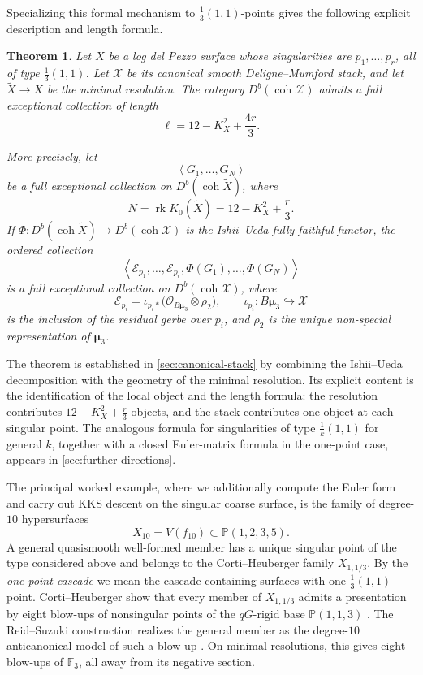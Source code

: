 \documentclass[11pt]{article}
\theoremstyle{plain}
\newtheorem{theorem}{Theorem}[section]
\theoremstyle{definition}
\theoremstyle{remark}
\newcommand{\Pp}{\mathbb P}
\newcommand{\F}{\mathbb F}
\newcommand{\Db}{D^b}
\newcommand{\coh}{\operatorname{coh}}
\newcommand{\rk}{\operatorname{rk}}
\newcommand{\XX}{\mathcal X}
\newcommand{\muthree}{\boldsymbol{\mu}_3}
\newcommand{\OO}{\mathcal O}
\begin{document}
Specializing this formal mechanism to \(\frac13(1,1)\)-points gives the
following explicit description and length formula.

\begin{theorem}\label{thm:general-main}
Let \(X\) be a log del Pezzo surface whose singularities are \(p_1,\dots,p_r\), all of type \(\frac13(1,1)\). Let \(\XX\) be its canonical smooth Deligne--Mumford stack, and let \(\widetilde X\to X\) be the minimal resolution. The category \(\Db(\coh \XX)\) admits a full exceptional collection of length
\[
\ell=12-K_X^2+\frac{4r}{3}.
\]

More precisely, let
\[
\left\langle G_1,\dots,G_N\right\rangle
\]
be a full exceptional collection on \(\Db(\coh \widetilde X)\), where
\[
N=\rk K_0(\widetilde X)=12-K_X^2+\frac r3.
\]
If \(\Phi:\Db(\coh \widetilde X)\to \Db(\coh \XX)\) is the Ishii--Ueda fully faithful functor, the ordered collection
\[
\left\langle
\mathcal E_{p_1},\dots,\mathcal E_{p_r},
\Phi(G_1),\dots,\Phi(G_N)
\right\rangle
\]
is a full exceptional collection on \(\Db(\coh \XX)\), where
\[
\mathcal E_{p_i}
=
\iota_{p_i*}\bigl(\OO_{B\muthree}\otimes \rho_2\bigr),
\qquad
\iota_{p_i}:B\muthree\hookrightarrow \XX
\]
is the inclusion of the residual gerbe over \(p_i\), and \(\rho_2\) is the unique non-special representation of \(\muthree\).
\end{theorem}

The theorem is established in \cref{sec:canonical-stack} by combining the Ishii--Ueda decomposition with the geometry of the minimal resolution. Its explicit content is the identification of the local object and the length formula: the resolution contributes \(12-K_X^2+\frac r3\) objects, and the stack contributes one object at each singular point. The analogous formula for singularities of type \(\frac1k(1,1)\) for general \(k\), together with a closed Euler-matrix formula in the one-point case, appears in \cref{sec:further-directions}.

The principal worked example, where we additionally compute the Euler form
and carry out KKS descent on the singular coarse surface, is the family of
degree-\(10\) hypersurfaces
\[
X_{10}=V(f_{10})\subset \Pp(1,2,3,5).
\]
A general quasismooth well-formed member has a unique singular point of the type considered above and belongs to the Corti--Heuberger family \(X_{1,1/3}\). By the \emph{one-point cascade} we mean the cascade containing surfaces with one \(\frac13(1,1)\)-point. Corti--Heuberger show that every member of \(X_{1,1/3}\) admits a presentation by eight blow-ups of nonsingular points of the \(qG\)-rigid base \(\Pp(1,1,3)\) \cite[Corollary~8(1)]{Corti2016}. The Reid--Suzuki construction realizes the general member as the degree-\(10\) anticanonical model of such a blow-up \cite[Section~1 and Table~1.1]{ReidSuzuki2004}. On minimal resolutions, this gives eight blow-ups of \(\F_3\), all away from its negative section.
\end{document}
